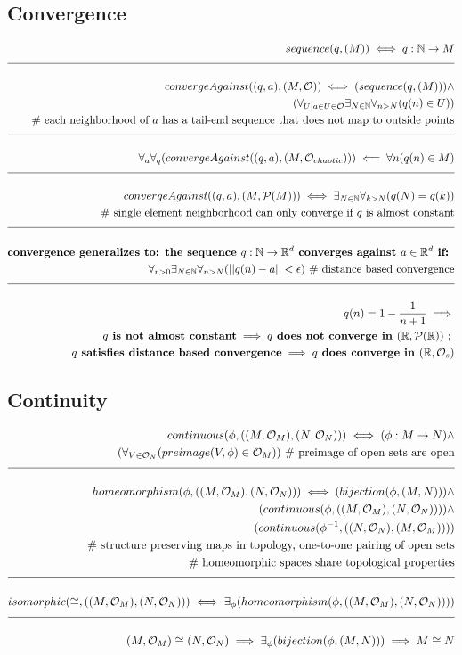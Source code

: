 \documentclass[a4paper]{article}
\newcommand{\eqComment}[1]{\text{  \# #1}}
\newcommand{\eqSep}{\text{ ;  }}
\newcommand{\n}{\\[1.5ex] \hline \nonumber \\[0ex]}
\newcommand{\m}{\nonumber \\}
\begin{document}
\subsection{Convergence}
\begin{tcolorbox}
\begin{align}
   sequence(q, (M)) \iff q: \mathbb{N} \to M
\n convergeAgainst((q, a), (M, \mathcal{O})) \iff (sequence(q, (M))) \land
\m (\forall_{U | a \in U \in \mathcal{O}} \exists_{N \in \mathbb{N}} \forall_{n > N} (q(n) \in U))
\m \eqComment{each neighborhood of $a$ has a tail-end sequence that does not map to outside points}
\n \forall_a \forall_q (convergeAgainst((q, a), (M, \mathcal{O}_{chaotic}))) \impliedby \forall{n} (q(n) \in M)
\n convergeAgainst((q, a), (M, \mathcal{P}(M))) \iff \exists_{N \in \mathbb{N}} \forall_{k > N} (q(N) = q(k)) 
\m \eqComment{single element neighborhood can only converge if $q$ is almost constant} 
\n \textbf{convergence generalizes to: the sequence $q: \mathbb{N} \to \mathbb{R}^d$ converges against $a \in \mathbb{R}^d$ if: }
\m \forall_{r > 0} \exists_{N \in \mathbb{N}} \forall_{n > N} (|| q(n) - a || < \epsilon) \eqComment{distance based convergence}
\n q(n) = 1 - \frac{1}{n + 1} \implies
\m \textbf{$q$ is not almost constant} \implies \textbf{$q$ does not converge in $(\mathbb{R}, \mathcal{P}(\mathbb{R}))$} \eqSep
\m \textbf{$q$ satisfies distance based convergence} \implies \textbf{$q$ does converge in $(\mathbb{R}, \mathcal{O}_s)$}
\end {align}
\end{tcolorbox}

\subsection{Continuity}
\begin{tcolorbox}
\begin{align}
    continuous(\phi, ((M, \mathcal{O}_M), (N, \mathcal{O}_N))) \iff (\phi: M \to N) \land
\m (\forall_{V \in \mathcal{O}_N} (preimage(V, \phi) \in \mathcal{O}_M)) \eqComment{preimage of open sets are open}
\n homeomorphism(\phi, ((M, \mathcal{O}_M), (N, \mathcal{O}_N))) \iff (bijection(\phi, (M, N))) \land
\m (continuous(\phi, ((M, \mathcal{O}_M), (N, \mathcal{O}_N)))) \land
\m (continuous(\phi^{-1}, ((N, \mathcal{O}_N), (M, \mathcal{O}_M))))
\m \eqComment{structure preserving maps in topology, one-to-one pairing of open sets}
\m \eqComment{homeomorphic spaces share topological properties}
\n isomorphic(\cong, ((M, \mathcal{O}_M), (N, \mathcal{O}_N))) \iff \exists_\phi (homeomorphism(\phi, ((M, \mathcal{O}_M), (N, \mathcal{O}_N))))
\n (M, \mathcal{O}_M) \cong (N, \mathcal{O}_N) \implies \exists_\phi(bijection(\phi, (M, N))) \implies M \cong N
\end {align}
\end{tcolorbox}
\end{document}
